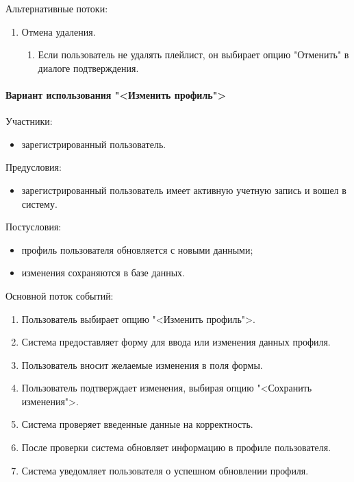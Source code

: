Альтернативные потоки:
\begin{enumerate}
	\item Отмена удаления.
	\begin{enumerate}
		\item Если пользователь не удалять плейлист, он выбирает опцию "Отменить" в диалоге подтверждения.
	\end{enumerate}
\end{enumerate}

\paragraph{Вариант использования "<Изменить профиль">}

Участники:
\begin{itemize}
	\item зарегистрированный пользователь.
\end{itemize}

Предусловия:
\begin{itemize}
	\item зарегистрированный пользователь имеет активную учетную запись и вошел в систему.
\end{itemize}

Постусловия:
\begin{itemize}
	\item профиль пользователя обновляется с новыми данными;
	\item изменения сохраняются в базе данных.
\end{itemize}

Основной поток событий:
\begin{enumerate}
	\item Пользователь выбирает опцию "<Изменить профиль">.
	\item Система предоставляет форму для ввода или изменения данных профиля.
	\item Пользователь вносит желаемые изменения в поля формы.
	\item Пользователь подтверждает изменения, выбирая опцию "<Сохранить изменения">.
	\item Система проверяет введенные данные на корректность.
	\item После проверки система обновляет информацию в профиле пользователя.
	\item Система уведомляет пользователя о успешном обновлении профиля.
\end{enumerate}

